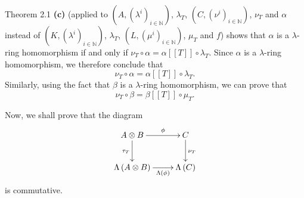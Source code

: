 \documentclass[numbers=enddot,12pt,final,onecolumn,notitlepage]{scrartcl}%
\begin{document}
Theorem 2.1 \textbf{(c)} (applied to $\left(  A,\left(  \lambda^{i}\right)
_{i\in\mathbb{N}}\right)  $, $\lambda_{T}$, $\left(  C,\left(  \nu^{i}\right)
_{i\in\mathbb{N}}\right)  $, $\nu_{T}$ and $\alpha$ instead of $\left(
K,\left(  \lambda^{i}\right)  _{i\in\mathbb{N}}\right)  $, $\lambda_{T}$,
$\left(  L,\left(  \mu^{i}\right)  _{i\in\mathbb{N}}\right)  $, $\mu_{T}$ and
$f$) shows that $\alpha$ is a $\lambda$-ring homomorphism if and only if
$\nu_{T}\circ\alpha=\alpha\left[  \left[  T\right]  \right]  \circ\lambda_{T}%
$. Since $\alpha$ is a $\lambda$-ring homomorphism, we therefore conclude that%
\begin{equation}
\nu_{T}\circ\alpha=\alpha\left[  \left[  T\right]  \right]  \circ\lambda_{T}.
\label{sol.6.11.b.alpha}%
\end{equation}
Similarly, using the fact that $\beta$ is a $\lambda$-ring homomorphism, we
can prove that%
\begin{equation}
\nu_{T}\circ\beta=\beta\left[  \left[  T\right]  \right]  \circ\mu_{T}.
\label{sol.6.11.b.beta}%
\end{equation}


Now, we shall prove that the diagram%
\begin{equation}%
\xymatrix{
A \otimes B \ar[r]^-{\phi} \ar[d]_{\tau_T} & C \ar[d]^{\nu_T} \\
\Lambda\left(A \otimes B\right) \ar[r]_-{\Lambda\left(\phi\right)}
& \Lambda\left(C\right)
}
\label{sol.6.11.b.diagram}%
\end{equation}
is commutative.
\end{document}
